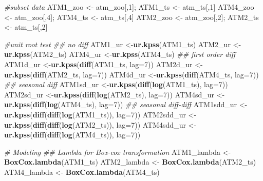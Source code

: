 \documentclass[openany]{book}
\newenvironment{Shaded}{\begin{snugshade}}{\end{snugshade}}
\newcommand{\CommentTok}[1]{\textcolor[rgb]{0.56,0.35,0.01}{\textit{#1}}}
\newcommand{\DataTypeTok}[1]{\textcolor[rgb]{0.13,0.29,0.53}{#1}}
\newcommand{\DecValTok}[1]{\textcolor[rgb]{0.00,0.00,0.81}{#1}}
\newcommand{\KeywordTok}[1]{\textcolor[rgb]{0.13,0.29,0.53}{\textbf{#1}}}
\newcommand{\NormalTok}[1]{#1}
\newcommand{\StringTok}[1]{\textcolor[rgb]{0.31,0.60,0.02}{#1}}
\begin{document}
\begin{Shaded}
\begin{Highlighting}[]
{{{{{{{{\CommentTok{#subset data }
\NormalTok{ATM1_zoo <-}\StringTok{ }\NormalTok{atm_zoo[,}\DecValTok{1}\NormalTok{]; ATM1_ts <-}\StringTok{ }\NormalTok{atm_ts[,}\DecValTok{1}\NormalTok{]}
\NormalTok{ATM4_zoo <-}\StringTok{ }\NormalTok{atm_zoo[,}\DecValTok{4}\NormalTok{]; ATM4_ts <-}\StringTok{ }\NormalTok{atm_ts[,}\DecValTok{4}\NormalTok{]}
\NormalTok{ATM2_zoo <-}\StringTok{ }\NormalTok{atm_zoo[,}\DecValTok{2}\NormalTok{]; ATM2_ts <-}\StringTok{ }\NormalTok{atm_ts[,}\DecValTok{2}\NormalTok{]}

\CommentTok{#unit root test}
\CommentTok{## no diff}
\NormalTok{ATM1_ur <-}\KeywordTok{ur.kpss}\NormalTok{(ATM1_ts)}
\NormalTok{ATM2_ur <-}\KeywordTok{ur.kpss}\NormalTok{(ATM2_ts)}
\NormalTok{ATM4_ur <-}\KeywordTok{ur.kpss}\NormalTok{(ATM4_ts)}
\CommentTok{## first order diff}
\NormalTok{ATM1d_ur <-}\KeywordTok{ur.kpss}\NormalTok{(}\KeywordTok{diff}\NormalTok{(ATM1_ts, }\DataTypeTok{lag=}\DecValTok{7}\NormalTok{))}
\NormalTok{ATM2d_ur <-}\KeywordTok{ur.kpss}\NormalTok{(}\KeywordTok{diff}\NormalTok{(ATM2_ts, }\DataTypeTok{lag=}\DecValTok{7}\NormalTok{))}
\NormalTok{ATM4d_ur <-}\KeywordTok{ur.kpss}\NormalTok{(}\KeywordTok{diff}\NormalTok{(ATM4_ts, }\DataTypeTok{lag=}\DecValTok{7}\NormalTok{))}
\CommentTok{## seasonal diff}
\NormalTok{ATM1sd_ur <-}\KeywordTok{ur.kpss}\NormalTok{(}\KeywordTok{diff}\NormalTok{(}\KeywordTok{log}\NormalTok{(ATM1_ts), }\DataTypeTok{lag=}\DecValTok{7}\NormalTok{))}
\NormalTok{ATM2sd_ur <-}\KeywordTok{ur.kpss}\NormalTok{(}\KeywordTok{diff}\NormalTok{(}\KeywordTok{log}\NormalTok{(ATM2_ts), }\DataTypeTok{lag=}\DecValTok{7}\NormalTok{))}
\NormalTok{ATM4sd_ur <-}\KeywordTok{ur.kpss}\NormalTok{(}\KeywordTok{diff}\NormalTok{(}\KeywordTok{log}\NormalTok{(ATM4_ts), }\DataTypeTok{lag=}\DecValTok{7}\NormalTok{))}
\CommentTok{## seasonal diff-diff}
\NormalTok{ATM1sdd_ur <-}\KeywordTok{ur.kpss}\NormalTok{(}\KeywordTok{diff}\NormalTok{(}\KeywordTok{diff}\NormalTok{(}\KeywordTok{log}\NormalTok{(ATM1_ts)), }\DataTypeTok{lag=}\DecValTok{7}\NormalTok{))}
\NormalTok{ATM2sdd_ur <-}\KeywordTok{ur.kpss}\NormalTok{(}\KeywordTok{diff}\NormalTok{(}\KeywordTok{diff}\NormalTok{(}\KeywordTok{log}\NormalTok{(ATM2_ts)), }\DataTypeTok{lag=}\DecValTok{7}\NormalTok{))}
\NormalTok{ATM4sdd_ur <-}\KeywordTok{ur.kpss}\NormalTok{(}\KeywordTok{diff}\NormalTok{(}\KeywordTok{diff}\NormalTok{(}\KeywordTok{log}\NormalTok{(ATM4_ts)), }\DataTypeTok{lag=}\DecValTok{7}\NormalTok{))}

\CommentTok{# Modeling }
\CommentTok{## Lambda for Box-cox transformation}
\NormalTok{ATM1_lambda <-}\StringTok{ }\KeywordTok{BoxCox.lambda}\NormalTok{(ATM1_ts)}
\NormalTok{ATM2_lambda <-}\StringTok{ }\KeywordTok{BoxCox.lambda}\NormalTok{(ATM2_ts)}
\NormalTok{ATM4_lambda <-}\StringTok{ }\KeywordTok{BoxCox.lambda}\NormalTok{(ATM4_ts)}

}}}}}}}}
\end{Highlighting}
\end{Shaded}
\end{document}
